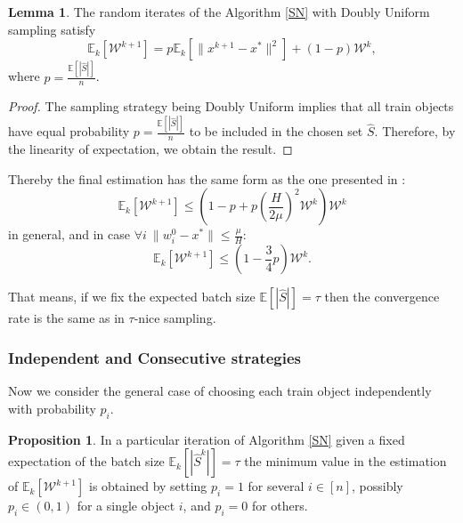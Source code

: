 \documentclass{article}
\theoremstyle{definition}
\theoremstyle{assumption}
\theoremstyle{lemma}
\newtheorem{lemma}{Lemma}
\theoremstyle{theorem}
\theoremstyle{proposition}
\newtheorem{proposition}{Proposition}
\begin{document}
	\begin{lemma} \label{lemma:4}
		The random iterates of the Algorithm \ref{SN} with Doubly Uniform sampling satisfy
		\begin{equation}
			\mathbb E_k[\mathcal W^{k+1}] = p \mathbb E_k[\| x^{k+1} - x^* \|^2] + \left(1 - p \right) \mathcal W^k,
		\end{equation}
	where $p = \frac{\mathbb E[|\hat S|]}{n}$.
	\end{lemma}
	\begin{proof}
		The sampling strategy being Doubly Uniform implies that all train objects have equal probability $p = \frac{\mathbb E[|\hat S|]}{n}$ to be included in the chosen set $\hat S$. Therefore, by the linearity of expectation, we obtain the result.
	\end{proof}
	Thereby the final estimation has the same form as the one presented in \cite{kovalev2019stochastic}:
	\begin{equation}\label{DU convergence}
		\mathbb E_k[\mathcal W^{k+1}] \leqslant \left( 1 - p + p \left( \frac{H}{2\mu} \right)^2 \mathcal W^k \right) \mathcal W^k
	\end{equation}
	in general, and in case $\forall i\ \| w_i^0 - x^* \| \leqslant \frac{\mu}{H}$:
	\begin{equation}
		\mathbb E_k[\mathcal W^{k+1}] \leqslant \left( 1 - \frac{3}{4}p \right) \mathcal W^k.
	\end{equation}

	That means, if we fix the expected batch size $\mathbb E [|\hat S|] = \tau$ then the convergence rate is the same as in $\tau$-nice sampling.
	
	\subsubsection{Independent and Consecutive strategies}
	
	Now we consider the general case of choosing each train object independently with probability $p_i$.
	
	\begin{proposition} \label{proposition:1}
		In a particular iteration of Algorithm \ref{SN} given a fixed expectation of the batch size $\mathbb E_k[|\hat S^k|] = \tau$ the minimum value in the estimation of $\mathbb E_k[\mathcal W^{k+1}]$ is obtained by setting $p_i = 1$ for several $i \in [n]$, possibly $p_i \in (0, 1)$ for a single object $i$, and $p_i = 0$ for others.
	\end{proposition}
\end{document}

